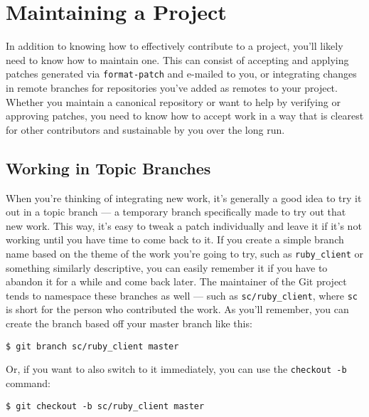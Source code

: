 \documentclass[a4paper]{book}
\begin{document}
\section{Maintaining a Project}

In addition to knowing how to effectively contribute to a project, you'll likely need to know how to maintain one. This can consist of accepting and applying patches generated via \texttt{format-patch} and e-mailed to you, or integrating changes in remote branches for repositories you've added as remotes to your project. Whether you maintain a canonical repository or want to help by verifying or approving patches, you need to know how to accept work in a way that is clearest for other contributors and sustainable by you over the long run.

\subsection{Working in Topic Branches}

When you're thinking of integrating new work, it's generally a good idea to try it out in a topic branch --- a temporary branch specifically made to try out that new work. This way, it's easy to tweak a patch individually and leave it if it's not working until you have time to come back to it. If you create a simple branch name based on the theme of the work you're going to try, such as \texttt{ruby\_client} or something similarly descriptive, you can easily remember it if you have to abandon it for a while and come back later. The maintainer of the Git project tends to namespace these branches as well --- such as \texttt{sc/ruby\_client}, where \texttt{sc} is short for the person who contributed the work. As you'll remember, you can create the branch based off your master branch like this:

\begin{shaded}\begin{verbatim}
$ git branch sc/ruby_client master
\end{verbatim}\end{shaded}

Or, if you want to also switch to it immediately, you can use the \texttt{checkout -b} command:

\begin{shaded}\begin{verbatim}
$ git checkout -b sc/ruby_client master
\end{verbatim}\end{shaded}
\end{document}
